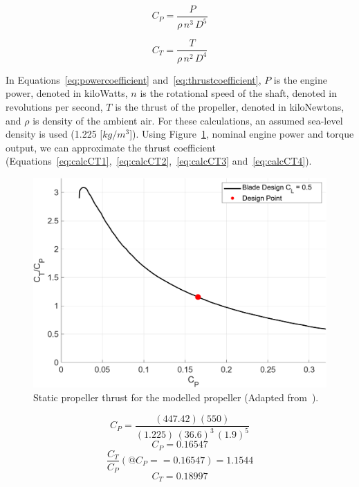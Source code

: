 \begin{equation}\label{eq:powercoefficient}
    C_P = \frac{P}{\rho \, n^3 \, D^5}
\end{equation}

\begin{equation}\label{eq:thrustcoefficient}
    C_T = \frac{T}{\rho \, n^2 \, D^4}
\end{equation}

In Equations~\ref{eq:powercoefficient} and~\ref{eq:thrustcoefficient}, \(P\) is the engine power, denoted in kiloWatts, \(n\) is the rotational speed of the shaft, denoted in revolutions per second, \(T\) is the thrust of the propeller, denoted in kiloNewtons, and \( \rho \) is density of the ambient air. For these calculations, an assumed sea-level density is used (1.225 [\(kg/m^3\)]). Using Figure~\ref{fig:staticpropthrust}, nominal engine power and torque output, we can approximate the thrust coefficient (Equations~\ref{eq:calcCT1},~\ref{eq:calcCT2},~\ref{eq:calcCT3} and~\ref{eq:calcCT4}).

\begin{figure}[!ht]
    \centering
    \includegraphics[width=0.85\linewidth]{Figures/StaticThrust.png}
    \caption{Static propeller thrust for the modelled propeller (Adapted from~\cite{GeneralizedMethodPropeller1963}).}\label{fig:staticpropthrust}
\end{figure}

\begin{equation}\label{eq:calcCT1}
    C_P = \frac{(447.42)(550)}{{(1.225)} \, {(36.6)}^3 \, {(1.9)}^5}
\end{equation}
\begin{equation}\label{eq:calcCT2}
    C_P = 0.16547
\end{equation}
\begin{equation}\label{eq:calcCT3}
    \frac{C_T}{C_P}(@C_P == 0.16547) = 1.1544
\end{equation}
\begin{equation}\label{eq:calcCT4}
    C_T = 0.18997
\end{equation}


